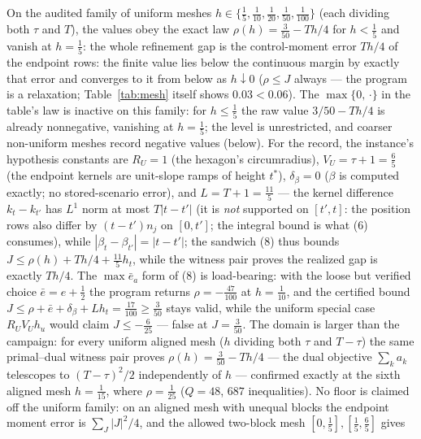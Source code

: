 \documentclass[10pt,twocolumn]{article}
\theoremstyle{plain}
\theoremstyle{definition}
\theoremstyle{remark}
\begin{document}
On the audited family of uniform meshes \(h \in \{\tfrac15,
\tfrac1{10}, \tfrac1{20}, \tfrac1{50}, \tfrac1{100}\}\) (each dividing
both \(\tau\) and \(T\)), the values obey the exact law \(\rho(h) =
\tfrac{3}{50} - Th/4\) for \(h < \tfrac15\) and vanish at \(h =
\tfrac15\): the whole refinement gap is the control-moment error \(Th/4\)
of the endpoint rows: the finite value lies below the continuous margin by
exactly that error and converges to it from below as \(h \downarrow 0\)
(\(\rho \le J\) always --- the program is a relaxation; Table~\ref{tab:mesh}
itself shows \(0.03 < 0.06\)). The \(\max\{0,\,\cdot\}\) in the
table's law is inactive on this family: for \(h \le \tfrac15\) the raw
value \(3/50 - Th/4\) is already nonnegative, vanishing at
\(h = \tfrac15\); the level is unrestricted, and coarser non-uniform
meshes record negative values (below).
For the record, the instance's hypothesis constants are
\(R_U = 1\) (the hexagon's circumradius), \(V_U = \tau + 1 = \tfrac65\)
(the endpoint kernels are unit-slope ramps of height \(t^{*}\)),
\(\delta_\beta = 0\) (\(\beta\) is computed exactly; no stored-scenario
error), and \(L = T + 1 = \tfrac{11}{5}\) --- the kernel difference \(k_t - k_{t'}\) has \(L^1\) norm at most
\(T|t - t'|\) (it is \emph{not} supported on \([t', t]\): the position
rows also differ by \((t - t')n_j\) on \([0, t']\); the integral bound is
what (6) consumes), while \(|\beta_t - \beta_{t'}| = |t - t'|\); the
sandwich (8) thus bounds \(J \le \rho(h) + Th/4 + \tfrac{11}{5}
h_t\), while the witness pair proves the realized gap is exactly
\(Th/4\). The \(\max \bar{e}_a\) form of (8) is load-bearing: with the
loose but verified choice \(\bar{e} = e + \tfrac12\) the program returns
\(\rho = -\tfrac{47}{100}\) at \(h = \tfrac1{10}\), and the certified bound \(J \le \rho + \bar{e} + \delta_\beta + L h_t = \tfrac{17}{100}
\ge \tfrac3{50}\) stays valid, while the uniform special case
\(R_U V_U h_u\) would claim \(J \le -\tfrac{6}{25}\) --- false at
\(J = \tfrac3{50}\). The domain is larger than the campaign: for every uniform aligned mesh
(\(h\) dividing both \(\tau\) and \(T - \tau\)) the same primal--dual
witness pair proves \(\rho(h) = \tfrac{3}{50} - Th/4\) --- the dual
objective \(\sum_k a_k\) telescopes to \((T-\tau)^2/2\) independently of
\(h\) --- confirmed exactly at the sixth aligned mesh \(h = \tfrac1{15}\),
where \(\rho = \tfrac1{25}\) (\(Q = 48\), \(687\) inequalities). No
floor is claimed off the uniform family: on an aligned mesh with unequal
blocks the endpoint moment error is \(\sum_J |J|^2/4\), and the allowed
two-block mesh \([0, \tfrac15], [\tfrac15, \tfrac65]\) gives
\end{document}
